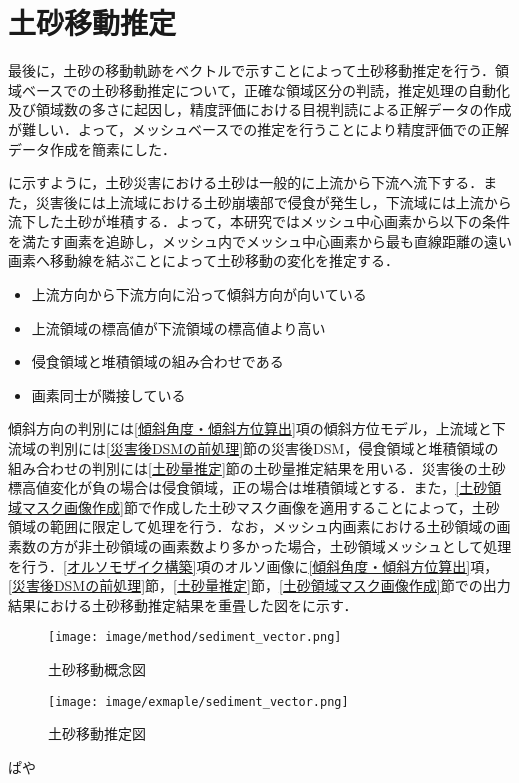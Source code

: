  \section{土砂移動推定}
    \label{土砂移動推定}
    最後に，土砂の移動軌跡をベクトルで示すことによって土砂移動推定を行う．領域ベースでの土砂移動推定について，正確な領域区分の判読，推定処理の自動化及び領域数の多さに起因し，精度評価における目視判読による正解データの作成が難しい．よって，メッシュベースでの推定を行うことにより精度評価での正解データ作成を簡素にした．

    に示すように，土砂災害における土砂は一般的に上流から下流へ流下する．また，災害後には上流域における土砂崩壊部で侵食が発生し，下流域には上流から流下した土砂が堆積する\cite{土砂量解析5}．よって，本研究ではメッシュ中心画素から以下の条件を満たす画素を追跡し，メッシュ内でメッシュ中心画素から最も直線距離の遠い画素へ移動線を結ぶことによって土砂移動の変化を推定する．

    \begin{itemize}
      \setlength{\itemsep}{-5pt}
      \item 上流方向から下流方向に沿って傾斜方向が向いている
      \item 上流領域の標高値が下流領域の標高値より高い
      \item 侵食領域と堆積領域の組み合わせである
      \item 画素同士が隣接している
    \end{itemize}

    傾斜方向の判別には\ref{傾斜角度・傾斜方位算出}項の傾斜方位モデル，上流域と下流域の判別には\ref{災害後DSMの前処理}節の災害後DSM，侵食領域と堆積領域の組み合わせの判別には\ref{土砂量推定}節の土砂量推定結果を用いる．災害後の土砂標高値変化が負の場合は侵食領域，正の場合は堆積領域とする．また，\ref{土砂領域マスク画像作成}節で作成した土砂マスク画像を適用することによって，土砂領域の範囲に限定して処理を行う．なお，メッシュ内画素における土砂領域の画素数の方が非土砂領域の画素数より多かった場合，土砂領域メッシュとして処理を行う．\ref{オルソモザイク構築}項のオルソ画像に\ref{傾斜角度・傾斜方位算出}項，\ref{災害後DSMの前処理}節，\ref{土砂量推定}節，\ref{土砂領域マスク画像作成}節での出力結果における土砂移動推定結果を重畳した図をに示す．
    
    \begin{figure}[tbp]
      \centering
      \texttt{[image: image/method/sediment\_vector.png]}
      \caption{土砂移動概念図}
      \label{土砂移動概念図}
    \end{figure}

    \begin{figure}[tbp]
      \centering
      \texttt{[image: image/exmaple/sediment\_vector.png]}
      \caption{土砂移動推定図}
      \label{土砂移動推定結果}
    \end{figure}
    ぱや
  
